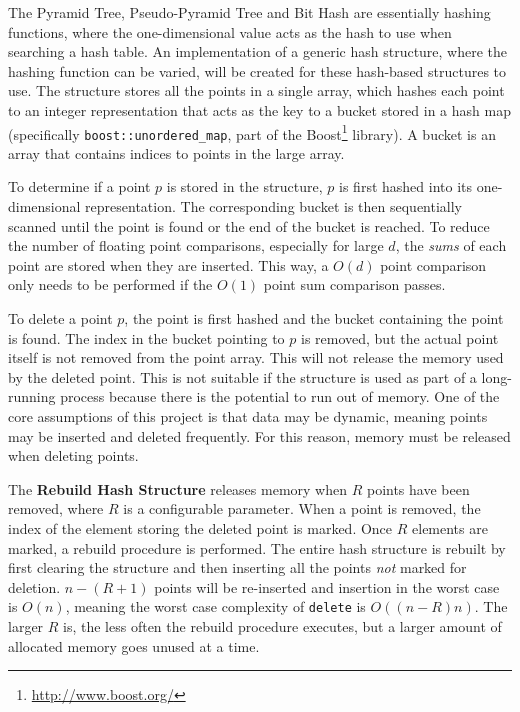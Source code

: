 The Pyramid Tree, Pseudo-Pyramid Tree and Bit Hash are essentially hashing functions, where the one-dimensional value acts as the hash to use when searching a hash table.
An implementation of a generic hash structure, where the hashing function can be varied, will be created for these hash-based structures to use. The structure stores all the points in a single array, which hashes each point to an integer representation that acts as the key to a bucket stored in a hash map (specifically \texttt{boost::unordered\_map}, part of the Boost\footnote{\url{http://www.boost.org/}} library). A bucket is an array that contains indices to points in the large array.

To determine if a point $p$ is stored in the structure, $p$ is first hashed into its one-dimensional representation. The corresponding bucket is then sequentially scanned until the point is found or the end of the bucket is reached. To reduce the number of floating point comparisons, especially for large $d$, the \textit{sums} of each point are stored when they are inserted. This way, a $O(d)$ point comparison only needs to be performed if the $O(1)$ point sum comparison passes.

To delete a point $p$, the point is first hashed and the bucket containing the point is found. The index in the bucket pointing to $p$ is removed, but the actual point itself is not removed from the point array. This will not release the memory used by the deleted point. This is not suitable if the structure is used as part of a long-running process because there is the potential to run out of memory. One of the core assumptions of this project is that data may be dynamic, meaning points may be inserted and deleted frequently. For this reason, memory must be released when deleting points.

The \textbf{Rebuild Hash Structure} releases memory when $R$ points have been removed, where $R$ is a configurable parameter. When a point is removed, the index of the element storing the deleted point is marked. Once $R$ elements are marked, a rebuild procedure is performed. The entire hash structure is rebuilt by first clearing the structure and then inserting all the points \textit{not} marked for deletion. $n - (R + 1)$ points will be re-inserted and insertion in the worst case is $O(n)$, meaning the worst case complexity of \texttt{delete} is $O((n - R)n)$. The larger $R$ is, the less often the rebuild procedure executes, but a larger amount of allocated memory goes unused at a time.

